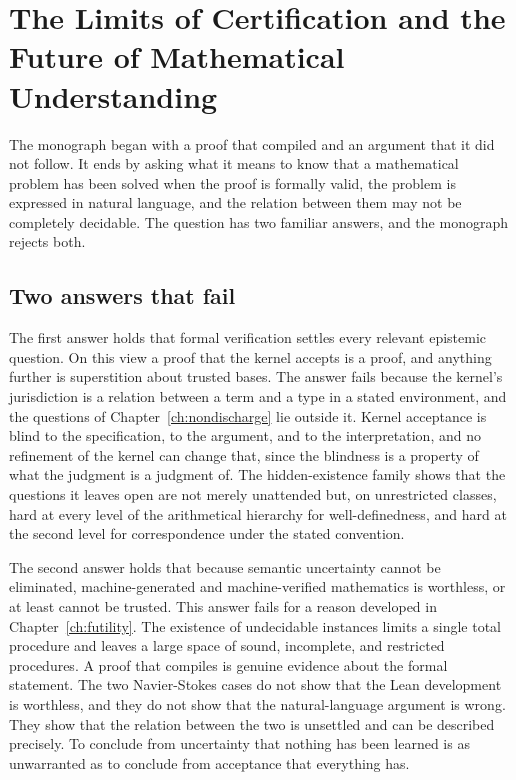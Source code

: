 \chapter[Limits of Certification]{The Limits of Certification and the Future of Mathematical Understanding}
\label{ch:conclusion}

The monograph began with a proof that compiled and an argument that it did not follow. It ends by asking what it means to know that a mathematical problem has been solved when the proof is formally valid, the problem is expressed in natural language, and the relation between them may not be completely decidable. The question has two familiar answers, and the monograph rejects both.

\section{Two answers that fail}

The first answer holds that formal verification settles every relevant epistemic question. On this view a proof that the kernel accepts is a proof, and anything further is superstition about trusted bases. The answer fails because the kernel's jurisdiction is a relation between a term and a type in a stated environment, and the questions of Chapter~\ref{ch:nondischarge} lie outside it. Kernel acceptance is blind to the specification, to the argument, and to the interpretation, and no refinement of the kernel can change that, since the blindness is a property of what the judgment is a judgment of. The hidden-existence family shows that the questions it leaves open are not merely unattended but, on unrestricted classes, hard at every level of the arithmetical hierarchy for well-definedness, and hard at the second level for correspondence under the stated convention.

The second answer holds that because semantic uncertainty cannot be eliminated, machine-generated and machine-verified mathematics is worthless, or at least cannot be trusted. This answer fails for a reason developed in Chapter~\ref{ch:futility}. The existence of undecidable instances limits a single total procedure and leaves a large space of sound, incomplete, and restricted procedures. A proof that compiles is genuine evidence about the formal statement. The two Navier-Stokes cases do not show that the Lean development is worthless, and they do not show that the natural-language argument is wrong. They show that the relation between the two is unsettled and can be described precisely. To conclude from uncertainty that nothing has been learned is as unwarranted as to conclude from acceptance that everything has.

